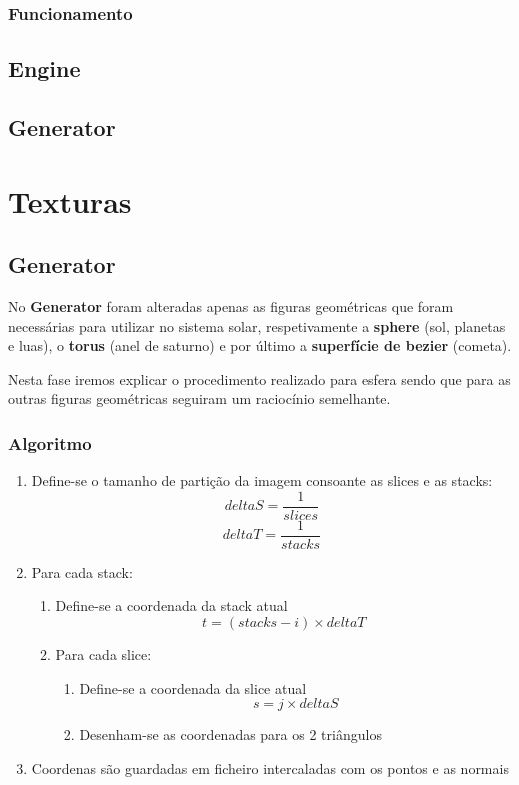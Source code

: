 \documentclass[a4paper]{article}
\begin{document}
\subsubsection{Funcionamento}
\label{sec:funcionamentoi}

\subsection{Engine}
\label{sec:enginei}

\subsection{Generator}
\label{sec:generatori}

\section{Texturas}
\label{sec:texturas}

\subsection{Generator}
\label{sec:generatort}

No \textbf{Generator} foram alteradas apenas as figuras geométricas que foram necessárias para utilizar no sistema solar, respetivamente a \textbf{sphere} (sol, planetas e luas), o \textbf{torus} (anel de saturno) e por último a \textbf{superfície de bezier} (cometa).

Nesta fase iremos explicar o procedimento realizado para esfera sendo que para as outras figuras geométricas seguiram um raciocínio semelhante.

\subsubsection{Algoritmo}
\label{sec:algoritmot}

\ttfamily
\begin{enumerate}
  \item Define-se o tamanho de partição da imagem consoante as slices e as stacks:
   	$$deltaS = \frac{1}{slices}$$  $$deltaT = \frac{1}{stacks}$$
  \item Para cada stack:
  \begin{enumerate}
  	\item Define-se a coordenada da stack atual
	$$ t = (stacks - i) \times deltaT $$
	\item Para cada slice:
	\begin{enumerate}
	 	\item Define-se a coordenada da slice atual
		$$ s = j \times deltaS $$
		\item Desenham-se as coordenadas para os 2 triângulos
	\end{enumerate}
  \end{enumerate}
  \item Coordenas são guardadas em ficheiro intercaladas com os pontos e as normais
\end{enumerate}
\rmfamily
\end{document}
